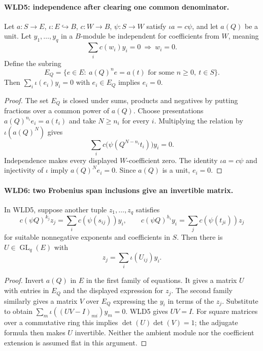 \paragraph{WLD5: independence after clearing one common denominator.}
\label{claim:WLD5}
Let $a:S\to E$, $\iota:E\hookrightarrow B$, $c:W\to B$,
$\psi:S\to W$ satisfy $\iota a=c\psi$, and let $a(Q)$ be a unit.
Let $y_1,\ldots,y_q$ in a $B$-module be independent for coefficients
from $W$, meaning
\[
             \sum_i c(w_i)y_i=0\ \Longrightarrow\ w_i=0.
\]
Define the subring
\[
 E_Q=\{e\in E:\ a(Q)^ne=a(t)
                    \text{ for some }n\ge0,\ t\in S\}.
\]
Then $\sum_i\iota(e_i)y_i=0$ with $e_i\in E_Q$ implies $e_i=0$.

\begin{proof}
The set $E_Q$ is closed under sums, products and negatives by putting
fractions over a common power of $a(Q)$. Choose presentations
$a(Q)^{n_i}e_i=a(t_i)$ and take $N\ge n_i$ for every $i$.
Multiplying the relation by $\iota(a(Q)^N)$ gives
\[
        \sum_i c\bigl(\psi(Q^{N-n_i}t_i)\bigr)y_i=0.
\]
Independence makes every displayed $W$-coefficient zero.
The identity $\iota a=c\psi$ and injectivity of $\iota$ imply
$a(Q)^Ne_i=0$. Since $a(Q)$ is a unit, $e_i=0$.
\end{proof}

\paragraph{WLD6: two Frobenius span inclusions give an invertible matrix.}
\label{claim:WLD6}
In WLD5, suppose another tuple $z_1,\ldots,z_q$ satisfies
\[
 c(\psi Q)^{k_j}z_j=\sum_i c(\psi(s_{ij}))y_i,\qquad
 c(\psi Q)^{h_i}y_i=\sum_j c(\psi(t_{ji}))z_j
\]
for suitable nonnegative exponents and coefficients in $S$.
Then there is $U\in\operatorname{GL}_q(E)$ with
\[
                         z_j=\sum_i\iota(U_{ij})y_i.       \tag{WLD.6}
\]

\begin{proof}
Invert $a(Q)$ in $E$ in the first family of equations. It gives a
matrix $U$ with entries in $E_Q$ and the displayed expression for
$z_j$. The second family similarly gives a matrix $V$ over $E_Q$
expressing the $y_i$ in terms of the $z_j$. Substitute to obtain
$\sum_m\iota((UV-I)_{mi})y_m=0$. WLD5 gives $UV=I$.
For square matrices over a commutative ring this implies
$\det(U)\det(V)=1$; the adjugate formula then makes $U$ invertible.
Neither the ambient module nor the coefficient extension is assumed
flat in this argument.
\end{proof}

